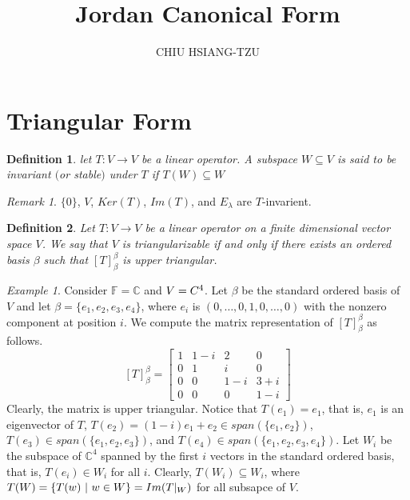 \documentclass[12pt,reqno]{amsart}
\theoremstyle{plain}
\newcommand{\C}{\mathbb{C}}
\newcommand{\kernal}[1]{Ker(#1)}
\newcommand{\image}[1]{Im(#1)}
\newcommand{\spanning}[1]{span(#1)}
\newtheorem{definition}{Definition}[section]
\theoremstyle{remark}
\newtheorem*{example}{Example}
\newtheorem*{remark}{Remark}
\begin{document}
	
\title{Jordan Canonical Form}
\author{CHIU HSIANG-TZU}
\maketitle

\section{Triangular Form}

\begin{definition}
	let $T:V \rightarrow V$ be a linear operator. A subspace $W \subseteq V$ is said to be invariant $($or stable$)$ under $T$ if $T(W) \subseteq W$
\end{definition}

\begin{remark}
	$\{0\}$, $V$, $\kernal{T}$, $\image{T}$, and $E_{\lambda}$ are $T$-invarient.
\end{remark}

\begin{definition}
	Let $T:V \rightarrow V$ be a linear operator on a finite dimensional vector space $V$. We say that $V$ is triangularizable if and only if there exists an ordered basis $\beta$ such that  $[T]^{\beta}_{\beta}$ is upper triangular.  
\end{definition}

\begin{example}
	Consider $\mathbb F = \C$ and $V = \mathbb \C^4$. Let $\beta$ be the standard ordered basis of $V$ and let $\beta = \{e_1,e_2,e_3,e_4\}$, where $e_i$ is $(0,…,0,1,0,…,0)$ with the nonzero component at position $i$. We compute the matrix representation of $[T]^{\beta}_{\beta}$ as follows.	
	$$[T]^{\beta}_{\beta} = \left[ 
	\begin{matrix}
		1&1-i&2&0\\
		0&1&i&0\\
		0&0&1-i&3+i\\
		0&0&0&1-i
	\end{matrix}\right]$$	
	Clearly, the matrix is upper triangular. Notice that $T(e_1) = e_1$, that is, $e_1$ is an eigenvector of $T$, $T(e_2) = (1-i)e_1 + e_2 \in \spanning{\{e_1,e_2\}}$, $T(e_3) \in \spanning{\{e_1,e_2,e_3\}}$, and $T(e_4) \in \spanning{\{e_1,e_2,e_3,e_4\}}$. Let $W_i$ be the subspace of $\C^4$ spanned by the first $i$ vectors in the standard ordered basis, that is, $T(e_i) \in W_i$ for all $i$. Clearly, $T(W_i) \subseteq W_i$, where $T(W) = \{T(w)~|~w \in W\} = \image{T\arrowvert_W}$ for all subsapce of $V$.
\end{example}
\end{document}
